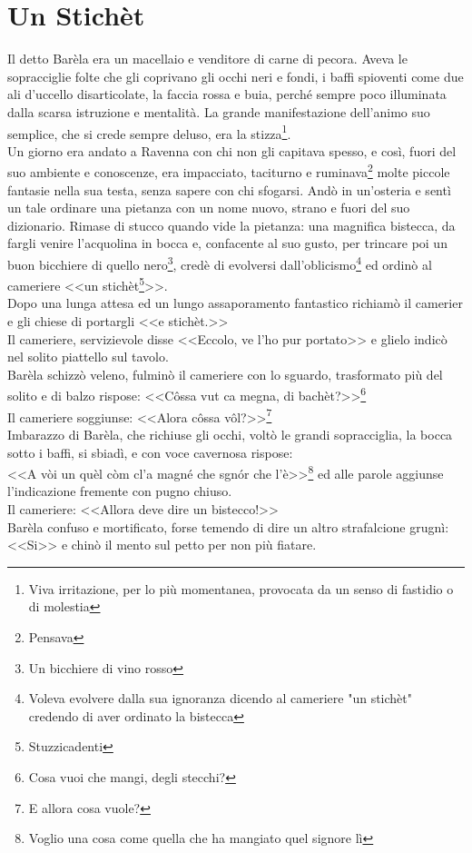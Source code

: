 
\chapter{Un Stichèt}
Il detto Barèla era un macellaio e venditore di carne di pecora. Aveva le sopracciglie folte che gli coprivano gli occhi neri e fondi, i baffi spioventi come due ali d'uccello disarticolate, la faccia rossa e buia, perché sempre poco illuminata dalla scarsa istruzione e mentalità. La grande manifestazione dell'animo suo semplice, che si crede sempre deluso, era la stizza\footnote{Viva irritazione, per lo più momentanea, provocata da un senso di fastidio o di molestia}.\\
\indent Un giorno era andato a Ravenna con chi non gli capitava spesso, e così, fuori del suo ambiente e conoscenze, era impacciato, taciturno e ruminava\footnote{Pensava} molte piccole fantasie nella sua testa, senza sapere con chi sfogarsi. Andò in un'osteria e sentì un tale ordinare una pietanza con un nome nuovo, strano e fuori del suo dizionario. Rimase di stucco quando vide la pietanza: una magnifica bistecca, da fargli venire l'acquolina in bocca e, confacente al suo gusto, per trincare poi un buon bicchiere di quello nero\footnote{Un bicchiere di vino rosso}, credè di evolversi dall'oblicismo\footnote{Voleva evolvere dalla sua ignoranza dicendo al cameriere "un stichèt" credendo di aver ordinato la bistecca} ed ordinò al cameriere <<un stichèt\footnote{Stuzzicadenti}>>. \\
\indent Dopo una lunga attesa ed un lungo assaporamento fantastico richiamò il camerier e gli chiese di portargli <<e stichèt.>>\\
\indent Il cameriere, servizievole disse <<Eccolo, ve l'ho pur portato>> e glielo indicò nel solito piattello sul tavolo.\\
Barèla schizzò veleno, fulminò il cameriere con lo sguardo, trasformato più del solito e di balzo rispose: <<Côssa vut ca megna, di bachèt?>>\footnote{Cosa vuoi che mangi, degli stecchi?}\\
\indent Il cameriere soggiunse: <<Alora côssa vôl?>>\footnote{E allora cosa vuole?}\\
\indent Imbarazzo di Barèla, che richiuse gli occhi, voltò le grandi sopracciglia, la bocca sotto i baffi, si sbiadì, e con voce cavernosa rispose: \\
\indent <<A vòi un quèl còm cl'a magné che sgnór che l'è>>\footnote{Voglio una cosa come quella che ha mangiato quel signore lì} ed alle parole aggiunse l'indicazione fremente con pugno chiuso.\\
\indent Il cameriere: <<Allora deve dire un bistecco!>>\\
Barèla confuso e mortificato, forse temendo di dire un altro strafalcione grugnì: <<Si>> e chinò il mento sul petto per non più fiatare.\\

